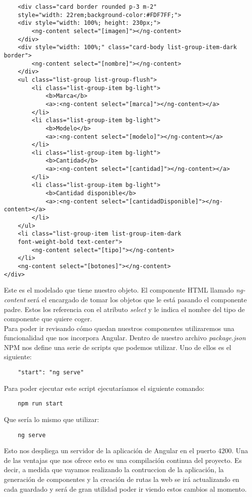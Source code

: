 \begin{verbatim}
    <div class="card border rounded p-3 m-2" 
    style="width: 22rem;background-color:#FDF7FF;">
    <div style="width: 100%; height: 230px;">
        <ng-content select="[imagen]"></ng-content>
    </div>
    <div style="width: 100%;" class="card-body list-group-item-dark border">
        <ng-content select="[nombre]"></ng-content>
    </div>
    <ul class="list-group list-group-flush">
        <li class="list-group-item bg-light">
            <b>Marca</b>
            <a>:<ng-content select="[marca]"></ng-content></a>
        </li>
        <li class="list-group-item bg-light">
            <b>Modelo</b>
            <a>:<ng-content select="[modelo]"></ng-content></a>
        </li>
        <li class="list-group-item bg-light">
            <b>Cantidad</b>
            <a>:<ng-content select="[cantidad]"></ng-content></a>
        </li>
        <li class="list-group-item bg-light">
            <b>Cantidad disponible</b>
            <a>:<ng-content select="[cantidadDisponible]"></ng-content></a>
        </li>
    </ul>
    <li class="list-group-item list-group-item-dark 
    font-weight-bold text-center">
        <ng-content select="[tipo]"></ng-content>
    </li>
    <ng-content select="[botones]"></ng-content>
</div>
\end{verbatim}
Este es el modelado que tiene nuestro objeto. El componente HTML llamado \textit{ng-content} será el encargado de tomar los objetos que le está pasando el componente padre. Estos los referencia con el atributo \textit{select} y le indica el nombre del tipo de componente que quiere coger.
\\Para poder ir revisando cómo quedan nuestros componentes utilizaremos una funcionalidad que nos incorpora Angular. Dentro de nuestro archivo \textit{package.json} NPM nos define una serie de scripts que podemos utilizar. Uno de ellos es el siguiente:
\begin{verbatim}
    "start": "ng serve"
\end{verbatim}
Para poder ejecutar este script ejecutaríamos el siguiente comando:
\begin{verbatim}
    npm run start
\end{verbatim}
Que sería lo mismo que utilizar:
\begin{verbatim}
    ng serve
\end{verbatim}
Esto nos despliega un servidor de la aplicación de Angular en el puerto 4200. Una de las ventajas que nos ofrece esto es una compilación continua del proyecto. Es decir, a medida que vayamos realizando la contruccion de la aplicación, la generación de componentes y la creación de rutas la web se irá actualizando en cada guardado y será de gran utilidad poder ir viendo estos cambios al momento.
